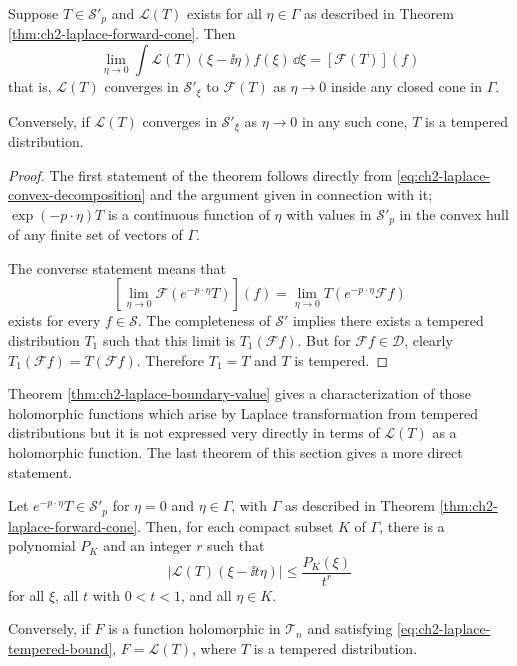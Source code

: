 \begin{theorem}[2-9]\label{thm:ch2-laplace-boundary-value}
Suppose $T\in\mathcal{S}'_p$ and $\mathcal{L}(T)$ exists for all
$\eta\in\Gamma$ as described in Theorem \ref{thm:ch2-laplace-forward-cone}.  Then
\begin{equation}
  \lim_{\eta\to0}\int\mathcal{L}(T)(\xi-\ii\eta)f(\xi)\,\dd\xi
  =[\mathcal{F}(T)](f)
  \tag{2-79}\label{eq:ch2-laplace-boundary}
\end{equation}
that is, $\mathcal{L}(T)$ converges in $\mathcal{S}'_\xi$ to
$\mathcal{F}(T)$ as $\eta\to0$ inside any closed cone in $\Gamma$.

Conversely, if $\mathcal{L}(T)$ converges in $\mathcal{S}'_\xi$ as
$\eta\to0$ in any such cone, $T$ is a tempered distribution.
\end{theorem}

\begin{proof}
The first statement of the theorem follows directly from \eqref{eq:ch2-laplace-convex-decomposition} and the
argument given in connection with it; $\exp(-p\cdot\eta)T$ is a continuous
function of $\eta$ with values in $\mathcal{S}'_p$ in the convex hull of any
finite set of vectors of $\Gamma$.

The converse statement means that
\begin{equation*}
  \left[\lim_{\eta\to0}\mathcal{F}(e^{-p\cdot\eta}T)\right](f)
  =\lim_{\eta\to0}T(e^{-p\cdot\eta}\mathcal{F}f)
\end{equation*}
exists for every $f\in\mathcal{S}$.  The completeness of $\mathcal{S}'$
implies there exists a tempered distribution $T_1$ such that this limit is
$T_1(\mathcal{F}f)$.  But for $\mathcal{F}f\in\mathcal{D}$, clearly
$T_1(\mathcal{F}f)=T(\mathcal{F}f)$.  Therefore $T_1=T$ and $T$ is
tempered.
\end{proof}

Theorem \ref{thm:ch2-laplace-boundary-value} gives a characterization of those holomorphic functions which
arise by Laplace transformation from tempered distributions but it is not
expressed very directly in terms of $\mathcal{L}(T)$ as a holomorphic
function.  The last theorem of this section gives a more direct statement.

\begin{theorem}[2-10]\label{thm:ch2-laplace-tempered-bound}
Let $e^{-p\cdot\eta}T\in\mathcal{S}'_p$ for $\eta=0$ and $\eta\in\Gamma$,
with $\Gamma$ as described in Theorem \ref{thm:ch2-laplace-forward-cone}.  Then, for each compact subset
$K$ of $\Gamma$, there is a polynomial $P_K$ and an integer $r$ such that
\begin{equation}
  |\mathcal{L}(T)(\xi-\ii t\eta)|\leq\frac{P_K(\xi)}{t^r}
  \tag{2-80}\label{eq:ch2-laplace-tempered-bound}
\end{equation}
for all $\xi$, all $t$ with $0<t<1$, and all $\eta\in K$.

Conversely, if $F$ is a function holomorphic in $\mathcal{T}_n$ and
satisfying \eqref{eq:ch2-laplace-tempered-bound}, $F=\mathcal{L}(T)$, where $T$ is a tempered
distribution.
\end{theorem}

